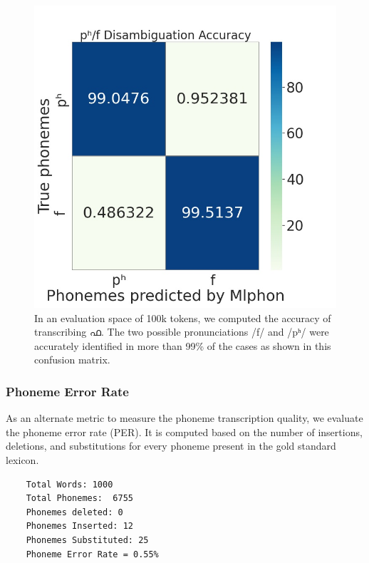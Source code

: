 \documentclass{ieeeaccess}
\begin{document}
\begin{figure}[!h]
	\centering
	\includegraphics[width=0.6\linewidth]{fa.jpg}
	\caption{In an evaluation space of 100k tokens, we computed the accuracy of transcribing  {\mal ഫ}. The two possible pronunciations /{\ipa f}/ and /{\ipa pʰ}/ were accurately identified in more than 99\% of the cases as shown in this confusion matrix.}
 
	\label{faconfusion}
\end{figure}

\subsubsection{Phoneme Error Rate}

As an alternate metric to measure the phoneme transcription quality, we evaluate the phoneme error rate (PER). It is computed based on the number of insertions, deletions, and substitutions for every phoneme present in the gold standard lexicon.




\begin{lstlisting}
	Total Words: 1000
	Total Phonemes:  6755
	Phonemes deleted: 0
	Phonemes Inserted: 12
	Phonemes Substituted: 25
	Phoneme Error Rate = 0.55%
\end{lstlisting}
\end{document}
